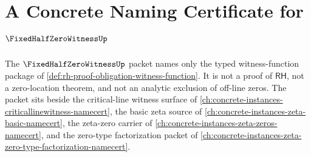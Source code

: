 \chapter{A Concrete Naming Certificate for $\FixedHalfZeroWitnessUp$}
\label{ch:concrete-instances-fixed-half-zero-witness-namecert}

The $\FixedHalfZeroWitnessUp$ packet names only the typed witness-function package of \autoref{def:rh-proof-obligation-witness-function}. It is not a proof of $\mathsf{RH}$, not a zero-location theorem, and not an analytic exclusion of off-line zeros. The packet sits beside the critical-line witness surface of \autoref{ch:concrete-instances-criticallinewitness-namecert}, the basic zeta source of \autoref{ch:concrete-instances-zeta-basic-namecert}, the zeta-zero carrier of \autoref{ch:concrete-instances-zeta-zeros-namecert}, and the zero-type factorization packet of \autoref{ch:concrete-instances-zeta-zero-type-factorization-namecert}.

